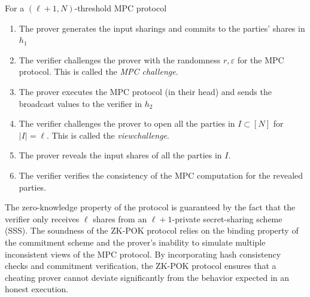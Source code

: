 \documentclass[11pt]{report}
\theoremstyle{definition}
\theoremstyle{plain}
\begin{document}
\begin{protocol}
  \label{pro:sdith-zkpok}
  For a $(\ell + 1, N)$-threshold MPC protocol
  \begin{enumerate}[parsep=0pt, itemsep=0pt, topsep=0pt]
    \item The prover generates the input sharings and commits to the parties' shares in $h_1$
    \item The verifier challenges the prover with the randomness \(r, \varepsilon\) for the MPC protocol. This is called the \textit{MPC challenge}.
    \item The prover executes the MPC protocol (in their head) and sends the broadcast values to the verifier in $h_2$
    \item The verifier challenges the prover to open all the parties in \(I \subset [N]\) for $|I| = \ell$. This is called the \textit{viewchallenge}.
    \item The prover reveals the input shares of all the parties in \(I\).
    \item The verifier verifies the consistency of the MPC computation for the revealed parties.
  \end{enumerate}
\end{protocol}

The zero-knowledge property of the protocol is guaranteed by the fact that the verifier only receives $\ell$ shares from an $\ell + 1$-private secret-sharing scheme (SSS).
The soundness of the ZK-POK protocol relies on the binding property of the commitment scheme and the prover's inability to simulate multiple inconsistent views of the MPC protocol. By incorporating hash consistency checks and commitment verification, the ZK-POK protocol ensures that a cheating prover cannot deviate significantly from the behavior expected in an honest execution.
\end{document}
